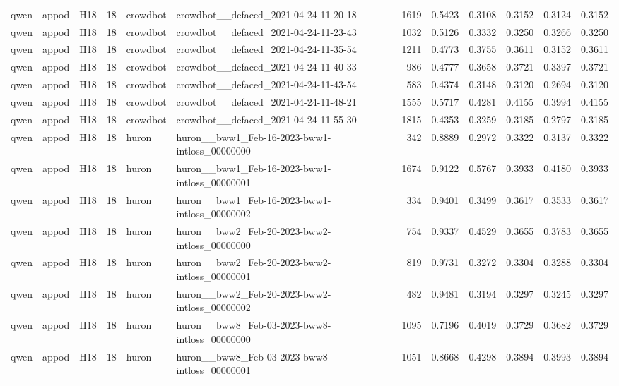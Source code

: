 \begin{table}[tbp]
\begin{tabular}{lllrllrrrrrr}
qwen & appod & H18 & 18 & crowdbot & crowdbot\_\_defaced\_2021-04-24-11-20-18 & 1619 & 0.5423 & 0.3108 & 0.3152 & 0.3124 & 0.3152 \\
qwen & appod & H18 & 18 & crowdbot & crowdbot\_\_defaced\_2021-04-24-11-23-43 & 1032 & 0.5126 & 0.3332 & 0.3250 & 0.3266 & 0.3250 \\
qwen & appod & H18 & 18 & crowdbot & crowdbot\_\_defaced\_2021-04-24-11-35-54 & 1211 & 0.4773 & 0.3755 & 0.3611 & 0.3152 & 0.3611 \\
qwen & appod & H18 & 18 & crowdbot & crowdbot\_\_defaced\_2021-04-24-11-40-33 & 986 & 0.4777 & 0.3658 & 0.3721 & 0.3397 & 0.3721 \\
qwen & appod & H18 & 18 & crowdbot & crowdbot\_\_defaced\_2021-04-24-11-43-54 & 583 & 0.4374 & 0.3148 & 0.3120 & 0.2694 & 0.3120 \\
qwen & appod & H18 & 18 & crowdbot & crowdbot\_\_defaced\_2021-04-24-11-48-21 & 1555 & 0.5717 & 0.4281 & 0.4155 & 0.3994 & 0.4155 \\
qwen & appod & H18 & 18 & crowdbot & crowdbot\_\_defaced\_2021-04-24-11-55-30 & 1815 & 0.4353 & 0.3259 & 0.3185 & 0.2797 & 0.3185 \\
qwen & appod & H18 & 18 & huron & huron\_\_bww1\_Feb-16-2023-bww1-intloss\_00000000 & 342 & 0.8889 & 0.2972 & 0.3322 & 0.3137 & 0.3322 \\
qwen & appod & H18 & 18 & huron & huron\_\_bww1\_Feb-16-2023-bww1-intloss\_00000001 & 1674 & 0.9122 & 0.5767 & 0.3933 & 0.4180 & 0.3933 \\
qwen & appod & H18 & 18 & huron & huron\_\_bww1\_Feb-16-2023-bww1-intloss\_00000002 & 334 & 0.9401 & 0.3499 & 0.3617 & 0.3533 & 0.3617 \\
qwen & appod & H18 & 18 & huron & huron\_\_bww2\_Feb-20-2023-bww2-intloss\_00000000 & 754 & 0.9337 & 0.4529 & 0.3655 & 0.3783 & 0.3655 \\
qwen & appod & H18 & 18 & huron & huron\_\_bww2\_Feb-20-2023-bww2-intloss\_00000001 & 819 & 0.9731 & 0.3272 & 0.3304 & 0.3288 & 0.3304 \\
qwen & appod & H18 & 18 & huron & huron\_\_bww2\_Feb-20-2023-bww2-intloss\_00000002 & 482 & 0.9481 & 0.3194 & 0.3297 & 0.3245 & 0.3297 \\
qwen & appod & H18 & 18 & huron & huron\_\_bww8\_Feb-03-2023-bww8-intloss\_00000000 & 1095 & 0.7196 & 0.4019 & 0.3729 & 0.3682 & 0.3729 \\
qwen & appod & H18 & 18 & huron & huron\_\_bww8\_Feb-03-2023-bww8-intloss\_00000001 & 1051 & 0.8668 & 0.4298 & 0.3894 & 0.3993 & 0.3894 \\

\end{tabular}
\end{table}
